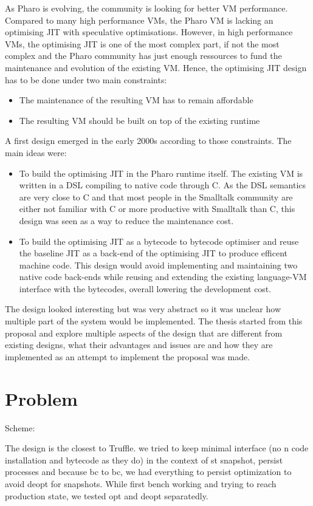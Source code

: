 \documentclass[a4paper,12pt,twoside]{../includes/ThesisStyle}
\begin{document}
As Pharo is evolving, the community is looking for better VM performance. Compared to many high performance VMs, the Pharo VM is lacking an optimising JIT with speculative optimisations. However, in high performance VMs, the optimising JIT is one of the most complex part, if not the most complex and the Pharo community has just enough ressources to fund the maintenance and evolution of the existing VM. Hence, the optimising JIT design has to be done under two main constraints:
\begin{itemize}
\item The maintenance of the resulting VM has to remain affordable
\item The resulting VM should be built on top of the existing runtime
\end{itemize}

A first design emerged in the early 2000s according to those constraints. The main ideas were:
\begin{itemize}
	\item To build the optimising JIT in the Pharo runtime itself. The existing VM is written in a DSL compiling to native code through C. As the DSL semantics are very close to C and that most people in the Smalltalk community are either not familiar with C or more productive with Smalltalk than C, this design was seen as a way to reduce the maintenance cost.
	\item To build the optimising JIT as a bytecode to bytecode optimiser and reuse the baseline JIT as a back-end of the optimising JIT to produce efficent machine code. This design would avoid implementing and maintaining two native code back-ends while reusing and extending the existing language-VM interface with the bytecodes, overall lowering the development cost.
\end{itemize}

The design looked interesting but was very abstract so it was unclear how multiple part of the system would be implemented. The thesis started from this proposal and explore multiple aspects of the design that are different from existing designs, what their advantages and issues are and how they are implemented as an attempt to implement the proposal was made.

\section{Problem}

Scheme:

The design is the closest to Truffle. 
we tried to keep minimal interface (no n code installation and bytecode as they do)
in the context of st snapshot, persist processes and because bc to bc, we had everything to persist optimization to avoid deopt for snapshots.
While first bench working and trying to reach production state, we tested opt and deopt separatedly. 
\end{document}
